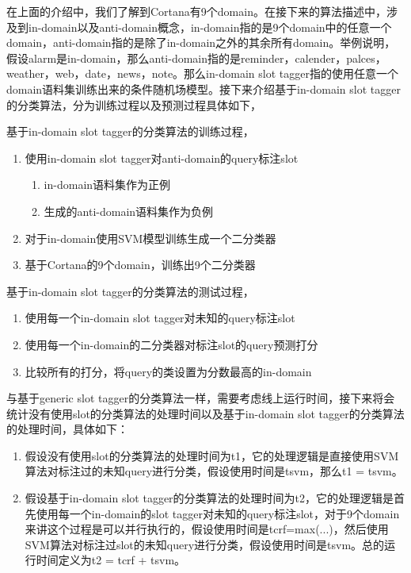\documentclass[master]{njuthesis}
\begin{document}
\begin{enumerate}
\begin{enumerate}
\begin{enumerate}
    在上面的介绍中，我们了解到Cortana有9个domain。在接下来的算法描述中，涉及到in-domain以及anti-domain概念，in-domain指的是9个domain中的任意一个domain，anti-domain指的是除了in-domain之外的其余所有domain。举例说明，假设alarm是in-domain，那么anti-domain指的是reminder，calender，palces，weather，web，date，news，note。那么in-domain slot tagger指的使用任意一个domain语料集训练出来的条件随机场模型。接下来介绍基于in-domain slot tagger的分类算法，分为训练过程以及预测过程具体如下，

   基于in-domain slot tagger的分类算法的训练过程，
   \begin{enumerate}
     \item 使用in-domain slot tagger对anti-domain的query标注slot
       \begin{enumerate}
         \item in-domain语料集作为正例
         \item 生成的anti-domain语料集作为负例
       \end{enumerate}
     \item 对于in-domain使用SVM模型训练生成一个二分类器
     \item 基于Cortana的9个domain，训练出9个二分类器
   \end{enumerate}
  
   基于in-domain slot tagger的分类算法的测试过程，
   \begin{enumerate}
     \item 使用每一个in-domain slot tagger对未知的query标注slot
     \item 使用每一个in-domain的二分类器对标注slot的query预测打分
     \item 比较所有的打分，将query的类设置为分数最高的in-domain
   \end{enumerate}
    
    与基于generic slot tagger的分类算法一样，需要考虑线上运行时间，接下来将会统计没有使用slot的分类算法的处理时间以及基于in-domain slot tagger的分类算法的处理时间，具体如下：
\begin{enumerate}
 \item 假设没有使用slot的分类算法的处理时间为t1，它的处理逻辑是直接使用SVM算法对标注过的未知query进行分类，假设使用时间是tsvm，那么t1 = tsvm。
 \item 假设基于in-domain slot tagger的分类算法的处理时间为t2，它的处理逻辑是首先使用每一个in-domain的slot tagger对未知的query标注slot，对于9个domain来讲这个过程是可以并行执行的，假设使用时间是tcrf=max(...)，然后使用SVM算法对标注过slot的未知query进行分类，假设使用时间是tsvm。总的运行时间定义为t2 = tcrf + tsvm。
\end{enumerate}


\end{enumerate}
\end{enumerate}
\end{enumerate}
\end{document}
